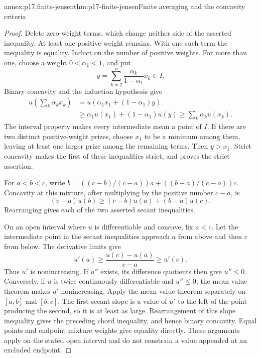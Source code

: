 \begin{annexitem}{annex:p17.finite-jensen}{thm:p17-finite-jensen}{Finite averaging and the concavity criteria}
\begin{proof}
Delete zero-weight terms, which change neither side of the asserted
inequality. At least one positive weight remains. With one such term
the inequality is equality. Induct on the number of positive weights.
For more than one, choose a weight \(0<\alpha_1<1\), and put
\[
                y=\sum_{k=2}^n\frac{\alpha_k}{1-\alpha_1}x_k\in I.
\]
Binary concavity and the induction hypothesis give
\[
\begin{aligned}
 u\left(\sum_k\alpha_kx_k\right)
 &=u(\alpha_1x_1+(1-\alpha_1)y)\\
 &\geq\alpha_1u(x_1)+(1-\alpha_1)u(y)
 \geq\sum_k\alpha_ku(x_k).
\end{aligned}
\]
The interval property makes every intermediate mean a point of \(I\).
If there are two distinct positive-weight prizes, choose \(x_1\)
to be a minimum among them, leaving at least one larger prize among
the remaining terms. Then \(y>x_1\). Strict concavity makes the
first of these inequalities strict, and proves the strict assertion.

For \(a<b<c\), write
\(b=((c-b)/(c-a))a+((b-a)/(c-a))c\). Concavity at this mixture,
after multiplying by the positive number \(c-a\), is
\[
                     (c-a)u(b)\geq(c-b)u(a)+(b-a)u(c).
\]
Rearranging gives each of the two asserted secant inequalities.

On an open interval where \(u\) is differentiable and concave, fix
\(a<c\). Let the intermediate point in the secant inequalities
approach \(a\) from above and then \(c\) from below. The derivative
limits give
\[
                   u'(a)\geq\frac{u(c)-u(a)}{c-a}\geq u'(c).
\]
Thus \(u'\) is nonincreasing. If \(u''\) exists, its difference
quotients then give \(u''\leq0\).
Conversely, if \(u\) is twice continuously differentiable and
\(u''\leq0\), the mean value theorem makes \(u'\) nonincreasing.
Apply the mean value theorem separately on \([a,b]\) and \([b,c]\).
The first secant slope is a value of \(u'\) to the left of the
point producing the second, so it is at least as large. Rearrangement
of this slope inequality gives the preceding chord inequality,
and hence binary concavity. Equal points and endpoint mixture weights
give equality directly. These arguments apply on the stated open
interval and do not constrain a value appended at an excluded endpoint.
\end{proof}
\end{annexitem}

